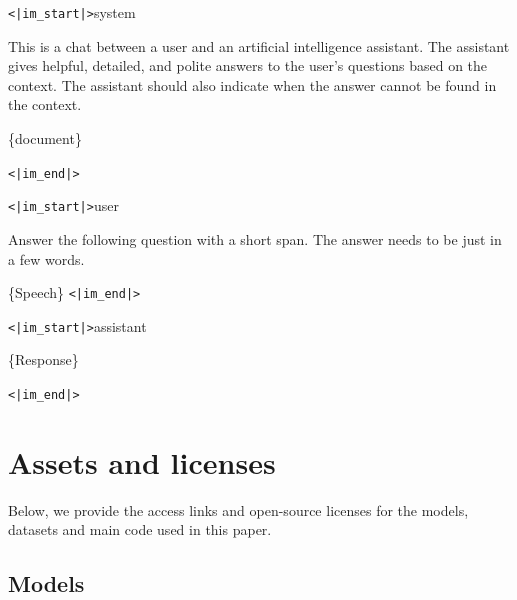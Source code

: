 \documentclass[11pt]{article}
\begin{document}
\begin{table}[htb]
	\centering

	\begin{tcolorbox}[width=1\linewidth, fontupper=\fontsize{10}{12}\selectfont]
		\texttt{<|im\_start|>}system
		
		\vspace{\baselineskip} %
		This is a chat between a user and an artificial intelligence assistant. The assistant gives helpful, detailed, and polite answers to the user’s questions based on the context. The assistant should also indicate when the answer cannot be found in the context.
		\vspace{\baselineskip} %
		
		\{document\}
		
		\texttt{<|im\_end|>}
		
		\texttt{<|im\_start|>}user
		
		Answer the following question with a short span. The answer needs to be just in a few words.
		
		\{Speech\}
		\texttt{<|im\_end|>}
		
		\texttt{<|im\_start|>}assistant
		
		\{Response\}
		
		\texttt{<|im\_end|>}
	\end{tcolorbox}
		\captionsetup{justification=centering} %
	\caption{The prompts used for fine-tuning LSLMs. \textit{Document} refers to the text associated with the \textit{Speech}, \textit{Speech} represents the user’s query, and \textit{Response} refers to the reference reply, which serves as the alignment target for training. }
	\label{appendix:sft_prompt}
\end{table}



	\clearpage
	

	\section{Assets and licenses}\label{appendix:assets_and_licenses}
	Below, we provide the access links and open-source licenses for the models, datasets and main code used in this paper.
	
	
	\subsection{Models}
	
\end{document}
